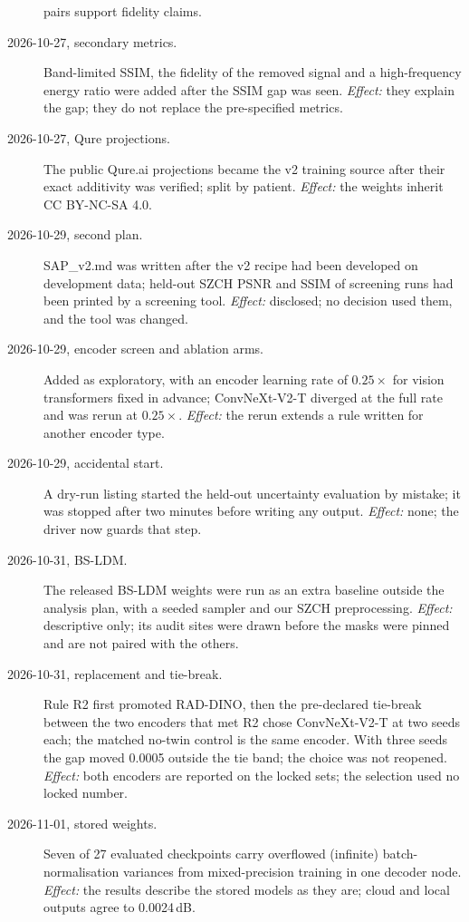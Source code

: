 \begin{description}
 pairs support fidelity claims.
\item[2026-10-27, secondary metrics.] Band-limited SSIM, the fidelity of the removed signal and a high-frequency energy ratio were added after
 the SSIM gap was seen. \emph{Effect:} they explain the gap; they do not replace the pre-specified metrics.
\item[2026-10-27, Qure projections.] The public Qure.ai projections became the v2 training source after their exact additivity was verified;
 split by patient. \emph{Effect:} the weights inherit CC BY-NC-SA 4.0.
\item[2026-10-29, second plan.] SAP\_v2.md was written after the v2 recipe had been developed on development data; held-out SZCH PSNR and SSIM of
 screening runs had been printed by a screening tool. \emph{Effect:} disclosed; no decision used them, and the tool was changed.
\item[2026-10-29, encoder screen and ablation arms.] Added as exploratory, with an encoder learning rate of $0.25\times$ for vision
 transformers fixed in advance; ConvNeXt-V2-T diverged at the full rate and was rerun at $0.25\times$. \emph{Effect:} the rerun extends a rule
 written for another encoder type.
\item[2026-10-29, accidental start.] A dry-run listing started the held-out uncertainty evaluation by mistake; it was stopped after two minutes
 before writing any output. \emph{Effect:} none; the driver now guards that step.
\item[2026-10-31, BS-LDM.] The released BS-LDM weights were run as an extra baseline outside the analysis plan, with a seeded sampler and our SZCH
 preprocessing. \emph{Effect:} descriptive only; its audit sites were drawn before the masks were pinned and are not paired with the others.
\item[2026-10-31, replacement and tie-break.] Rule R2 first promoted RAD-DINO, then the pre-declared tie-break between the two encoders that met
 R2 chose ConvNeXt-V2-T at two seeds each; the matched no-twin control is the same encoder. With three seeds the gap moved 0.0005 outside the
 tie band; the choice was not reopened. \emph{Effect:} both encoders are reported on the locked sets; the selection used no locked number.
\item[2026-11-01, stored weights.] Seven of 27 evaluated checkpoints carry overflowed (infinite) batch-normalisation variances from mixed-precision
 training in one decoder node. \emph{Effect:} the results describe the stored models as they are; cloud and local outputs agree to 0.0024\,dB.

\end{description}
